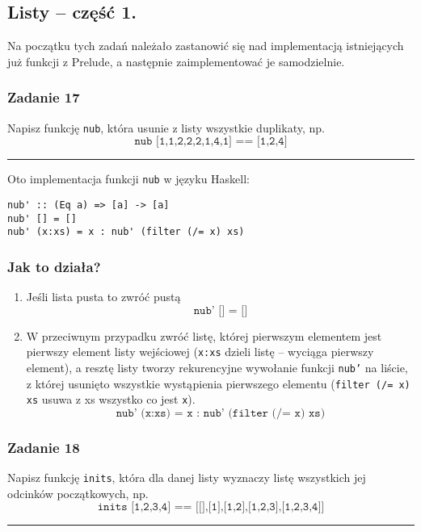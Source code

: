 \documentclass[11pt,a4paper]{article}
\begin{document}
\subsection{Listy -- część 1.}
Na początku tych zadań należało zastanowić się nad implementacją istniejących już funkcji z Prelude, a następnie zaimplementować je samodzielnie.
\subsubsection{Zadanie 17}
Napisz funkcję \texttt{nub}, która usunie z listy wszystkie duplikaty, np.
\[
\texttt{nub [1,1,2,2,2,1,4,1] == [1,2,4]}
\]

\bigskip
\hrule
\bigskip

Oto implementacja funkcji \texttt{nub} w języku Haskell:

\begin{Verbatim}[frame=single]
nub' :: (Eq a) => [a] -> [a]
nub' [] = []
nub' (x:xs) = x : nub' (filter (/= x) xs)
\end{Verbatim}

\subsubsection*{Jak to działa?}
\begin{enumerate}
    \item Jeśli lista pusta to zwróć pustą
        \[
            \texttt{nub' [] = []}
        \]
    \item W przeciwnym przypadku zwróć listę, której pierwszym elementem jest pierwszy element listy wejściowej (\texttt{x:xs} dzieli listę -- wyciąga pierwszy element), a resztę listy tworzy rekurencyjne wywołanie funkcji \texttt{nub'} na liście, z której usunięto wszystkie wystąpienia pierwszego elementu (\texttt{filter (/= x) xs} usuwa z xs wszystko co jest \texttt{x}).
        \[
            \texttt{nub' (x:xs) = x : nub' (filter (/= x) xs)}
        \]
\end{enumerate}

\subsubsection{Zadanie 18}
Napisz funkcję \texttt{inits}, która dla danej listy wyznaczy listę wszystkich jej odcinków
początkowych, np.
\[
    \texttt{inits [1,2,3,4] == [[],[1],[1,2],[1,2,3],[1,2,3,4]]}
\]

\bigskip
\hrule
\bigskip
\end{document}
